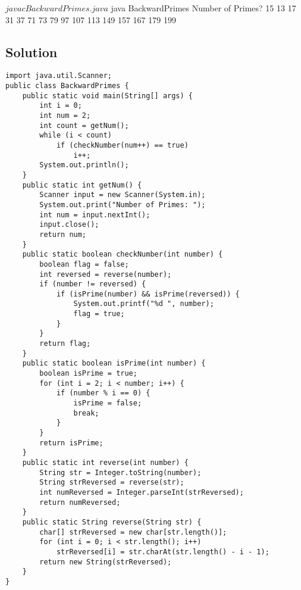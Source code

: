 \begin{terminal}
$ javac BackwardPrimes.java
$ java BackwardPrimes
Number of Primes? 15
13 17 31 37 71 73 79 97 107 113 149 157 167 179 199
\end{terminal}

\subsection*{Solution}

\lstset{language=Java,tabsize=4}
\begin{lstlisting}
import java.util.Scanner;
public class BackwardPrimes {
	public static void main(String[] args) {
		int i = 0;
		int num = 2;
		int count = getNum();
		while (i < count)
			if (checkNumber(num++) == true)
				i++;
		System.out.println();
	}
	public static int getNum() {
		Scanner input = new Scanner(System.in);
		System.out.print("Number of Primes: ");
		int num = input.nextInt();
		input.close();
		return num;
	}
	public static boolean checkNumber(int number) {
		boolean flag = false;
		int reversed = reverse(number);
		if (number != reversed) {
			if (isPrime(number) && isPrime(reversed)) {
				System.out.printf("%d ", number);
				flag = true;
			}
		}
		return flag;
	}
	public static boolean isPrime(int number) {
		boolean isPrime = true;
		for (int i = 2; i < number; i++) {
			if (number % i == 0) {
				isPrime = false;
				break;
			}
		}
		return isPrime;
	}
	public static int reverse(int number) {
		String str = Integer.toString(number);
		String strReversed = reverse(str);
		int numReversed = Integer.parseInt(strReversed);
		return numReversed;
	}
	public static String reverse(String str) {
		char[] strReversed = new char[str.length()];
		for (int i = 0; i < str.length(); i++)
			strReversed[i] = str.charAt(str.length() - i - 1);
		return new String(strReversed);
	}
}
\end{lstlisting}
